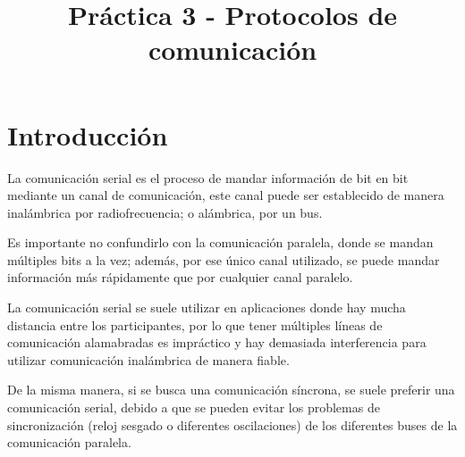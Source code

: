 \documentclass[conference]{IEEEtran}
\begin{document}
\title{Práctica 3 - Protocolos de comunicación}

\author{
\and
{}
}

\maketitle


\section{Introducción}
\par La comunicación serial es el proceso de mandar información de bit en bit mediante un canal de comunicación, este canal puede ser establecido de manera inalámbrica por radiofrecuencia; o alámbrica, por un bus.\\

\par Es importante no confundirlo con la comunicación paralela, donde se mandan múltiples bits a la vez; además, por ese único canal utilizado, se puede mandar información más rápidamente que por cualquier canal paralelo.\\

\par La comunicación serial se suele utilizar en aplicaciones donde hay mucha distancia entre los participantes, por lo que tener múltiples líneas de comunicación alamabradas es impráctico y hay demasiada interferencia para utilizar comunicación inalámbrica de manera fiable.\\

\par De la misma manera, si se busca una comunicación síncrona, se suele preferir una comunicación serial, debido a que se pueden evitar los problemas de sincronización (reloj sesgado o diferentes oscilaciones) de los diferentes buses de la comunicación paralela.\\
\end{document}
